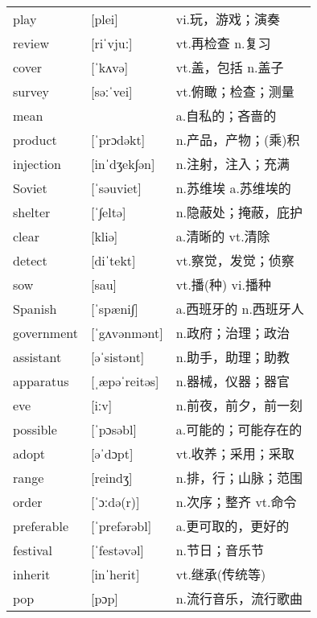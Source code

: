 \documentclass[a4paper]{article}
\begin{document}
\section{}
\begin{tabular}{l l l}

play & [plei] & vi.玩，游戏；演奏 \\
review & [riˈvjuː] & vt.再检查 n.复习 \\
cover & [ˈkʌvə] & vt.盖，包括 n.盖子 \\
survey & [səːˈvei] & vt.俯瞰；检查；测量 \\
mean &  & a.自私的；吝啬的 \\
product & [ˈprɔdəkt] & n.产品，产物；(乘)积 \\
injection & [inˈdʒek∫ən] & n.注射，注入；充满 \\
Soviet & [ˈsəuviet] & n.苏维埃 a.苏维埃的 \\
shelter & [ˈ∫eltə] & n.隐蔽处；掩蔽，庇护 \\
clear & [kliə] & a.清晰的 vt.清除 \\
detect & [diˈtekt] & vt.察觉，发觉；侦察 \\
sow & [sau] & vt.播(种) vi.播种 \\
Spanish & [ˈspæni∫] & a.西班牙的 n.西班牙人 \\
government & [ˈgʌvənmənt] & n.政府；治理；政治 \\
assistant & [əˈsistənt] & n.助手，助理；助教 \\
apparatus & [ˌæpəˈreitəs] & n.器械，仪器；器官 \\
eve & [iːv] & n.前夜，前夕，前一刻 \\
possible & [ˈpɔsəbl] & a.可能的；可能存在的 \\
adopt & [əˈdɔpt] & vt.收养；采用；采取 \\
range & [reindʒ] & n.排，行；山脉；范围 \\
order & [ˈɔːdə(r)] & n.次序；整齐 vt.命令 \\
preferable & [ˈprefərəbl] & a.更可取的，更好的 \\
festival & [ˈfestəvəl] & n.节日；音乐节 \\
inherit & [inˈherit] & vt.继承(传统等) \\
pop & [pɔp] & n.流行音乐，流行歌曲 \\

\end{tabular}
\end{document}
